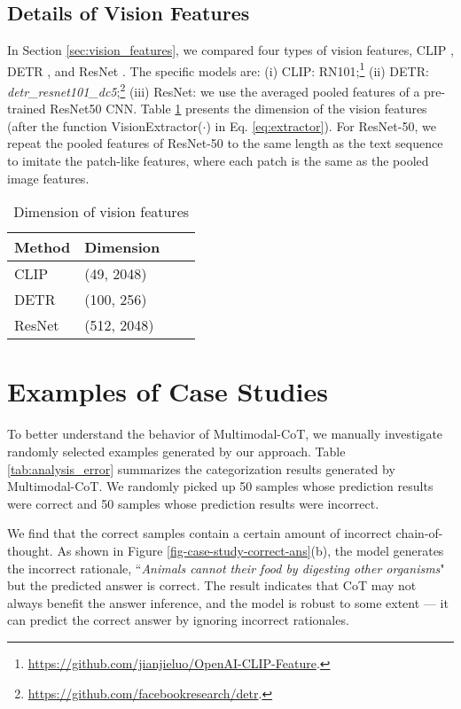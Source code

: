 \documentclass[nohyperref]{article}
\theoremstyle{plain}
\theoremstyle{definition}
\theoremstyle{remark}
\begin{document}
\subsection{Details of Vision Features}\label{appendix:vision_features}
In Section \ref{sec:vision_features}, we compared four types of vision features, CLIP \citep{radford2021learning}, DETR \citep{carion2020end}, and ResNet \citep{he2016deep}. The specific models are: (i) CLIP: RN101;\footnote{\url{https://github.com/jianjieluo/OpenAI-CLIP-Feature}.} (ii) DETR: \textit{detr\_resnet101\_dc5};\footnote{\url{https://github.com/facebookresearch/detr}.} (iii) ResNet: we use the averaged pooled features of a pre-trained ResNet50 CNN. Table \ref{tab:visual_dimension} presents the dimension of the vision features (after the function \textrm{VisionExtractor}($\cdot$) in Eq. \ref{eq:extractor}). For ResNet-50, we repeat the 
pooled features of ResNet-50 to the same length as the text sequence to imitate the patch-like features, where each patch is the same as the pooled image features. 

\begin{table}[htb]
\centering\small
        \caption{Dimension of vision features\label{tab:visual_dimension}}
\begin{tabular}{llcc}\toprule
 {Method} & {Dimension} \\\midrule
 \quad  CLIP & (49, 2048) \\
 \quad  DETR& (100, 256) \\
 \quad  ResNet & (512, 2048) \\
\bottomrule
\end{tabular}
\end{table}

\section{Examples of Case Studies}\label{appendix:case_study}
To better understand the behavior of Multimodal-CoT, we manually investigate randomly selected examples generated by our approach. Table \ref{tab:analysis_error} summarizes the categorization results generated by Multimodal-CoT. We randomly picked up 50 samples whose prediction results were correct and 50 samples whose prediction results were incorrect.

We find that the correct samples contain a certain amount of incorrect chain-of-thought.
As shown in Figure \ref{fig-case-study-correct-ans}(b), the model generates the incorrect rationale, ``\textit{Animals cannot their food by digesting other organisms}" but the predicted answer is correct. The result indicates that CoT may not always benefit the answer inference, and the model is robust to some extent --- it can predict the correct answer by ignoring incorrect rationales.
\end{document}
